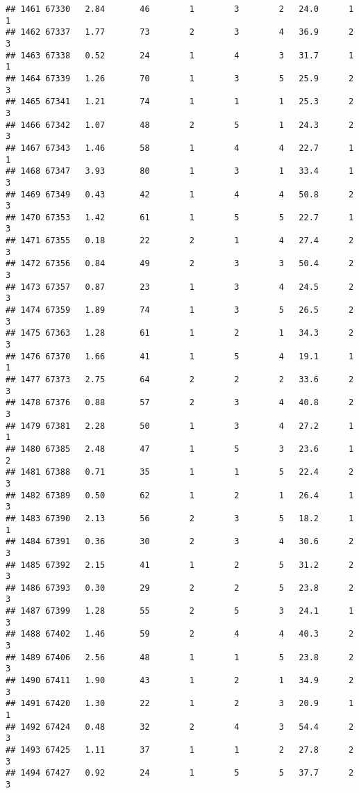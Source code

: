 \documentclass[
]{article}
\begin{document}
\begin{verbatim}
## 1461 67330   2.84       46        1        3        2   24.0      1      1
## 1462 67337   1.77       73        2        3        4   36.9      2      3
## 1463 67338   0.52       24        1        4        3   31.7      1      1
## 1464 67339   1.26       70        1        3        5   25.9      2      3
## 1465 67341   1.21       74        1        1        1   25.3      2      3
## 1466 67342   1.07       48        2        5        1   24.3      2      3
## 1467 67343   1.46       58        1        4        4   22.7      1      1
## 1468 67347   3.93       80        1        3        1   33.4      1      3
## 1469 67349   0.43       42        1        4        4   50.8      2      3
## 1470 67353   1.42       61        1        5        5   22.7      1      3
## 1471 67355   0.18       22        2        1        4   27.4      2      3
## 1472 67356   0.84       49        2        3        3   50.4      2      3
## 1473 67357   0.87       23        1        3        4   24.5      2      3
## 1474 67359   1.89       74        1        3        5   26.5      2      3
## 1475 67363   1.28       61        1        2        1   34.3      2      3
## 1476 67370   1.66       41        1        5        4   19.1      1      1
## 1477 67373   2.75       64        2        2        2   33.6      2      3
## 1478 67376   0.88       57        2        3        4   40.8      2      3
## 1479 67381   2.28       50        1        3        4   27.2      1      1
## 1480 67385   2.48       47        1        5        3   23.6      1      2
## 1481 67388   0.71       35        1        1        5   22.4      2      3
## 1482 67389   0.50       62        1        2        1   26.4      1      3
## 1483 67390   2.13       56        2        3        5   18.2      1      1
## 1484 67391   0.36       30        2        3        4   30.6      2      3
## 1485 67392   2.15       41        1        2        5   31.2      2      3
## 1486 67393   0.30       29        2        2        5   23.8      2      3
## 1487 67399   1.28       55        2        5        3   24.1      1      3
## 1488 67402   1.46       59        2        4        4   40.3      2      3
## 1489 67406   2.56       48        1        1        5   23.8      2      3
## 1490 67411   1.90       43        1        2        1   34.9      2      3
## 1491 67420   1.30       22        1        2        3   20.9      1      1
## 1492 67424   0.48       32        2        4        3   54.4      2      3
## 1493 67425   1.11       37        1        1        2   27.8      2      3
## 1494 67427   0.92       24        1        5        5   37.7      2      3

\end{verbatim}
\end{document}
